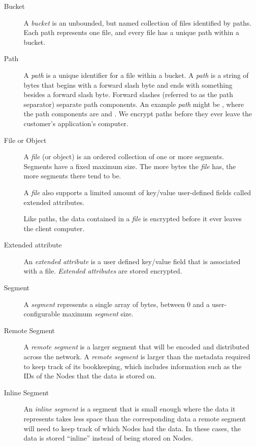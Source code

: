 \documentclass[8pt,fleqn,openany]{book}
\begin{document}
\begin{description}
\item[Bucket] A  {\em bucket} is an unbounded, but named
collection of files identified by paths. Each path represents one
file, and every file has a unique path within a bucket.

\item[Path] A {\em path} is a unique identifier for a file within a
bucket. A {\em path} is a string of bytes that begins with a forward
slash byte and ends with something besides a forward slash byte. Forward
slashes (referred to as the path separator) separate path components.
An example {\em path} might be , where the path components are
 and .
We encrypt paths before they ever leave the customer's application's
computer.

\item[File or Object] A {\em file} (or object) is an ordered
collection of one or more segments. Segments have a fixed maximum size.
The more bytes the {\em file} has, the more segments there tend to be.

A {\em file} also supports a limited amount of key/value user-defined fields
called extended attributes.

Like paths, the data contained in a {\em file} is encrypted before it ever
leaves the client computer.

\item[Extended attribute] An {\em extended attribute} is a user defined key/value
field that is associated with a file. {\em Extended attributes} are stored encrypted.

\item[Segment] A {\em segment} represents a single array of bytes, between 0 and a
user-configurable maximum {\em segment} size.

\item[Remote Segment] A {\em remote segment} is a larger segment that will be
encoded and distributed across the network. A {\em remote segment} is larger than
the metadata required to keep track of its bookkeeping, which includes information such as the IDs of the Nodes that the data is stored on.

\item[Inline Segment] An {\em inline segment} is a segment that is small
enough where the data it represents takes less space than the corresponding
data a remote segment will need to keep track of which Nodes had the data.
In these cases, the data is stored ``inline'' instead of being stored on Nodes.


\end{description}
\end{document}
